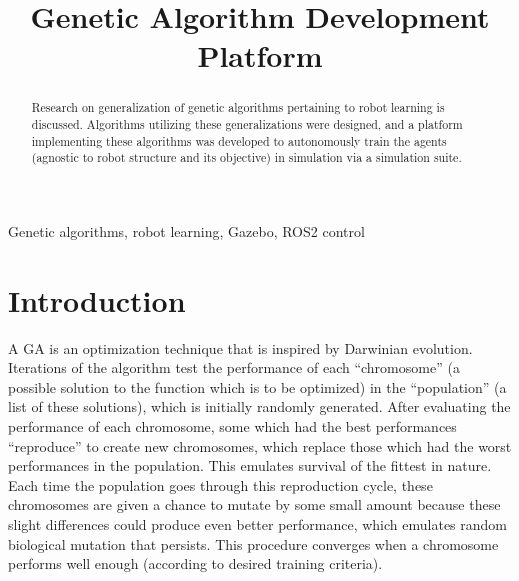 \documentclass[conference]{IEEEtran}
\begin{document}
	
	\title{Genetic Algorithm Development Platform}
	
	\author{
	}
	
	\maketitle
	
	\begin{abstract}
		Research on generalization of genetic algorithms pertaining to robot learning is discussed. Algorithms utilizing these generalizations were designed, and a platform implementing these algorithms was developed to autonomously train the agents (agnostic to robot structure and its objective) in simulation via a simulation suite.
	\end{abstract}
	
	\begin{IEEEkeywords}
		Genetic algorithms, robot learning, Gazebo, ROS2 control
	\end{IEEEkeywords}
	
	\section{Introduction}

	A \ac{GA} is an optimization technique that is inspired by Darwinian evolution. Iterations of the algorithm test the performance of each ``chromosome'' (a possible solution to the function which is to be optimized) in the ``population'' (a list of these solutions), which is initially randomly generated. After evaluating the performance of each chromosome, some which had the best performances ``reproduce'' to create new chromosomes, which replace those which had the worst performances in the population. This emulates survival of the fittest in nature. Each time the population goes through this reproduction cycle, these chromosomes are given a chance to mutate by some small amount because these slight differences could produce even better performance, which emulates random biological mutation that persists. This procedure converges when a chromosome performs well enough (according to desired training criteria).
\end{document}
